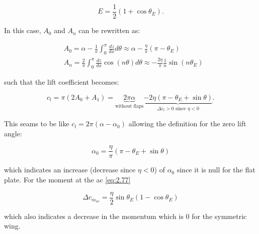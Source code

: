	\begin{equation}
	E = \frac{1}{2} (1+\cos \theta _E).
\end{equation}	 

	In this case, $A_0$ and $A_n$ can be rewritten as:
	
	\begin{equation}
	\begin{aligned}
	&A_0 = \alpha - \frac{1}{\pi} \int _0 ^\pi \frac{dz}{dx} d\theta \approx \alpha - \frac{\eta}{\pi} (\pi - \theta _E) \\
	&A_n = \frac{2}{\pi} \int _0 ^\pi \frac{dz}{dx} \cos (n\theta )d\theta \approx -\frac{2\eta}{\pi} \frac{1}{n} \sin (n\theta _E)
	\end{aligned}
	\end{equation}
	
	such that the lift coefficient becomes: 
	
	\begin{equation}
	c_l = \pi (2A_0 + A_1) = \underbrace{2\pi \alpha}_{\mbox{without flaps}} \underbrace{- 2\eta (\pi - \theta _E + \sin \theta)}_{\Delta c_l > 0 \mbox{ since } \eta < 0}.
	\end{equation}
	
	This seams to be like $c_l = 2\pi (\alpha - \alpha _0)$ allowing the definition for the zero lift angle: 
	
	\begin{equation}
	\alpha _0 = \frac{\eta}{\pi} (\pi - \theta _E + \sin \theta)
	\end{equation}
	
	which indicates an increase (decrease since $\eta <0$) of $\alpha _0$ since it is null for the flat plate. For the moment at the ac \eqref{eq:2.77}
	
	\begin{equation}
	\Delta c_{m_{ac}} = \frac{\eta }{2} \sin \theta _E (1- \cos \theta _E)
	\end{equation}
	
	which also indicates a decrease in the momentum which is 0 for the symmetric wing. 
	
